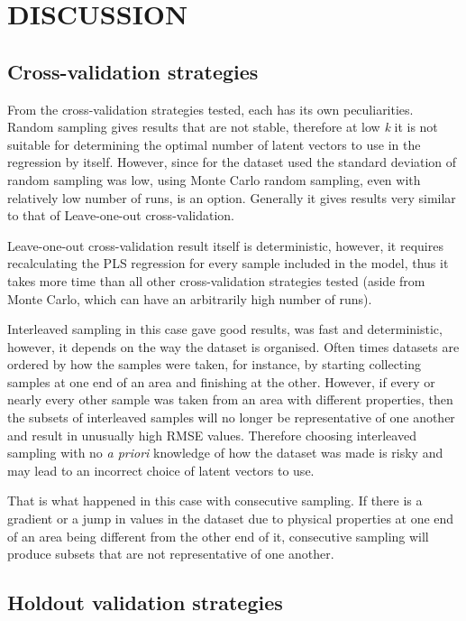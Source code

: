 \documentclass{isprs}
\begin{document}
\section{DISCUSSION}\label{sec:DISCUSSION}

\subsection{Cross-validation strategies}\label{sec:Cross-validation strategies 3}

From the cross-validation strategies tested, each has its own peculiarities. Random sampling gives results that are not stable, therefore at low \textit{k} it is not suitable for determining the optimal number of latent vectors to use in the regression by itself. However, since for the dataset used the standard deviation of random sampling was low, using Monte Carlo random sampling, even with relatively low number of runs, is an option. Generally it gives results very similar to that of Leave-one-out cross-validation.

Leave-one-out cross-validation result itself is deterministic, however, it requires recalculating the PLS regression for every sample included in the model, thus it takes more time than all other cross-validation strategies tested (aside from Monte Carlo, which can have an arbitrarily high number of runs).

Interleaved sampling in this case gave good results, was fast and deterministic, however, it depends on the way the dataset is organised. Often times datasets are ordered by how the samples were taken, for instance, by starting collecting samples at one end of an area and finishing at the other. However, if every or nearly every other sample was taken from an area with different properties, then the subsets of interleaved samples will no longer be representative of one another and result in unusually high RMSE values. Therefore choosing interleaved sampling with no \textit{a priori} knowledge of how the dataset was made is risky and may lead to an incorrect choice of latent vectors to use.

That is what happened in this case with consecutive sampling. If there is a gradient or a jump in values in the dataset due to physical properties at one end of an area being different from the other end of it, consecutive sampling will produce subsets that are not representative of one another.

\subsection{Holdout validation strategies}\label{sec:Holdout validation strategies 3}
\end{document}

